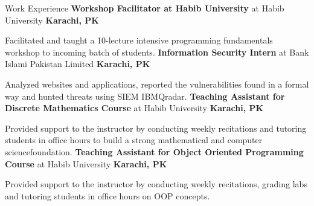 \begin{rubric}{Work Experience}
%
	\textbf{Workshop Facilitator at Habib University} at Habib University \hfill\textbf{Karachi, PK}
        \par Facilitated and taught a 10-lecture intensive programming fundamentals workshop to incoming batch of students. 
%
        \textbf{Information Security Intern} at Bank Islami Pakistan Limited  \hfill\textbf{Karachi, PK}
        \par Analyzed websites and applications, reported the vulnerabilities found in a formal way and hunted threats using SIEM IBMQradar.
%
        \textbf{Teaching Assistant for Discrete Mathematics Course} at Habib University \hfill \textbf{Karachi, PK}
        \par \par Provided support to the instructor by conducting weekly recitations and tutoring students in office hours to build a strong mathematical and computer sciencefoundation.
%
        \textbf{Teaching Assistant for Object Oriented Programming Course} at Habib University \hfill \textbf{Karachi, PK}
        \par \par Provided support to the instructor by conducting weekly recitations, grading labs and tutoring students in office hours on OOP concepts.
        
        
\end{rubric}